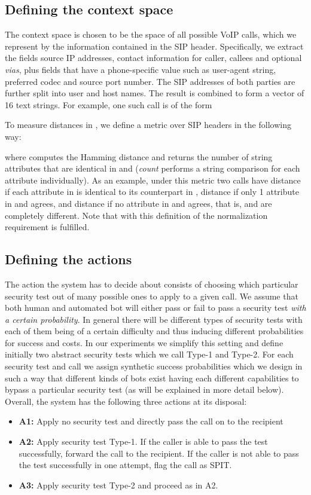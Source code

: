 \documentclass{llncs}
\begin{document}
\subsection{Defining the context space}
The context space  is chosen to be the space of all possible VoIP calls,
which we represent by the information contained in the SIP header. 
Specifically, we extract the fields source IP addresses, contact information for caller, 
callees and optional \emph{vias}, plus fields that have a phone-specific value such as 
user-agent string, preferred codec and source port number. The SIP addresses of both 
parties are further split into user and host names. The result is combined to form a 
vector of 16 text strings. 
For example, one such call  is of the form

To measure distances in , we define a metric over SIP headers in 
the following way:

where  computes the Hamming distance and
returns the number of string attributes that are identical in  and  
({\em count} performs a string comparison for each attribute individually). 
As an example, under this metric  two calls 
have distance  if each attribute in  is identical to its counterpart in ,
distance  if only 1 attribute in  and  agrees, and distance
 if no attribute in  and  agrees, that is,  and  are 
completely different. Note that with this definition of  the normalization
requirement  is fulfilled.




\subsection{Defining the actions}
The action the system has to decide about consists of choosing which particular
security test out of many possible ones to apply to a given call.  
We assume that both human and automated bot will either pass or fail to pass a security test {\em with a certain probability}. 
In general there will be different types of security
tests with each of them being of a certain difficulty and thus inducing different 
probabilities for success and costs. In our experiments we simplify this setting and define
initially two abstract security tests which we call Type-1 and Type-2. For each security test
and call  we assign synthetic success probabilities which we design in such
a way that different kinds of bots exist having each different capabilities to bypass
a particular security test (as will be explained in more detail below).
Overall, the system has the following three actions at its disposal:
\begin{itemize}
\item {\bf A1:} Apply no security test and directly pass the call on to the recipient

\item {\bf A2:} Apply security test Type-1. If the caller is able to pass the test
successfully, forward the call to the recipient. If the caller is not able to pass 
the test successfully in one attempt, flag the call as SPIT.

\item{\bf A3:} Apply security test Type-2 and proceed as in A2.
\end{itemize}
\end{document}
